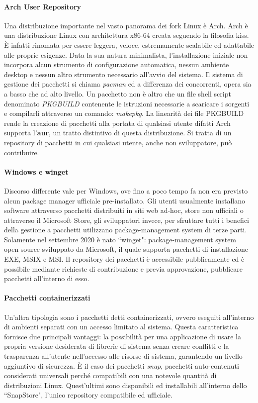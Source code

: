 \paragraph{Arch User Repository} Una distribuzione importante nel vasto panorama dei fork Linux è Arch. Arch è una distribuzione Linux con architettura x86-64 creata seguendo la filosofia \ac{kiss}. È infatti rinomata per essere leggera, veloce, estremamente scalabile ed adattabile alle proprie esigenze. Data la sua natura minimalista, l'installazione iniziale non incorpora alcun strumento di configurazione automatica, nessun ambiente desktop e nessun altro strumento necessario all'avvio del sistema. Il sistema di gestione dei pacchetti si chiama \textit{pacman} ed a differenza dei concorrenti, opera sia a basso che ad alto livello. Un pacchetto non è altro che un file shell script denominato \textit{PKGBUILD} contenente le istruzioni necessarie a scaricare i sorgenti e compilarli attraverso un comando: \textit{makepkg}. La linearità dei file PKGBUILD rende la creazione di pacchetti alla portata di qualsiasi utente difatti Arch supporta l'\textbf{\ac{aur}}, un tratto distintivo di questa distribuzione. Si tratta di un repository di pacchetti in cui qualsiasi utente, anche non sviluppatore, può contribuire.  

\paragraph{Windows e winget} Discorso differente vale per Windows, ove fino a poco tempo fa non era previsto alcun package manager ufficiale pre-installato. Gli utenti usualmente installano software attraverso pacchetti distribuiti in siti web ad-hoc, store non ufficiali o attraverso il Microsoft Store, gli sviluppatori invece, per sfruttare tutti i benefici della gestione a pacchetti utilizzano package-management system di terze parti. Solamente nel settembre 2020 è nato ``winget": package-management system open-source sviluppato da Microsoft, il quale supporta pacchetti di installazione EXE, MSIX e MSI. Il repository dei pacchetti è accessibile pubblicamente ed è possibile mediante richieste di contribuzione e previa approvazione, pubblicare pacchetti all'interno di esso.

\paragraph{Pacchetti containerizzati} Un'altra tipologia sono i pacchetti detti containerizzati, ovvero eseguiti all'interno di ambienti separati con un accesso limitato al sistema. Questa caratteristica fornisce due principali vantaggi: la possibilità per una applicazione di usare la propria versione desiderata di librerie di sistema senza creare conflitti e la trasparenza all'utente nell'accesso alle risorse di sistema, garantendo un livello aggiuntivo di sicurezza. È il caso dei pacchetti \textit{snap}, pacchetti auto-contenuti considerati universali perché compatibili con una notevole quantità di distribuzioni Linux. Quest'ultimi sono disponibili ed installabili all'interno dello ``SnapStore", l'unico repository compatibile ed ufficiale.

